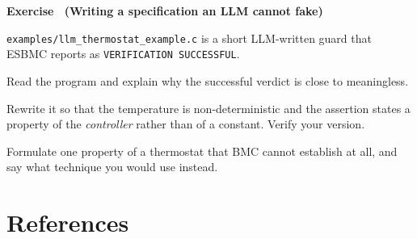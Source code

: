 \documentclass[11pt,a4paper]{article}
\newcommand{\esbmc}{ESBMC}
\newcommand{\file}[1]{\texttt{\small #1}}
\newcounter{exc}
\renewcommand{\theexc}{\arabic{exc}}
\newenvironment{exercise}[2][]
  {\stepcounter{exc}\ifx\relax#1\relax\else\excref{#1}\fi%
   \medskip\noindent\textbf{Exercise \theexc\ (#2)}\par\nopagebreak\smallskip}
  {\par\medskip}
\begin{document}
\begin{exercise}{Writing a specification an LLM cannot fake}
\file{examples/llm\_thermostat\_example.c} is a short LLM-written guard that
\esbmc{} reports as \texttt{VERIFICATION SUCCESSFUL}.

\begin{parts}
  \item Read the program and explain why the successful verdict is close to
        meaningless.
  \item Rewrite it so that the temperature is non-deterministic and the
        assertion states a property of the \emph{controller} rather than of a
        constant. Verify your version.
  \item Formulate one property of a thermostat that BMC cannot establish at all,
        and say what technique you would use instead.
\end{parts}
\end{exercise}

\section*{References}
\end{document}
